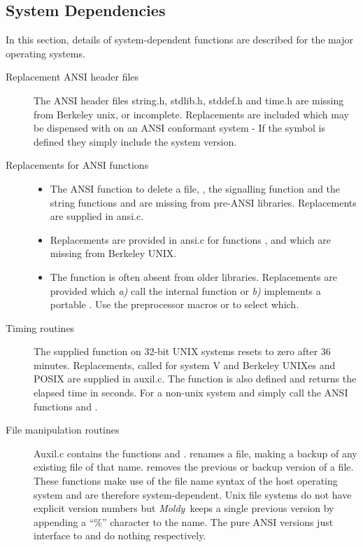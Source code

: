 \documentclass[a4paper,twoside]{report}
\newcommand{\Fname}[1]{{\upshape\mdseries\sffamily#1}}
\newcommand{\moldy}{\emph{Moldy}}
\begin{document}
\subsection{System Dependencies}
In this section, details of system-dependent functions are described
for the major operating systems.
  \begin{description}
\item[Replacement ANSI header files]
 \begin{sloppypar}
   The ANSI header files \Fname{string.h}, \Fname{stdlib.h},
   \Fname{stddef.h} and \Fname{time.h} are missing from Berkeley
   unix, or incomplete.  Replacements are included which may be
   dispensed with on an ANSI conformant system - If the symbol
    is defined they simply include the system
   version.
 \end{sloppypar}

\item[Replacements for ANSI functions] \hspace*{1em}
\noindent 
  \begin{itemize}
  \item The ANSI function to delete a file, , the
    signalling function  and the string functions
     and  are missing from
    pre-ANSI libraries.  Replacements are supplied in \Fname{ansi.c}.
  \item Replacements are provided in \Fname{ansi.c} for functions
    ,  and  which
    are missing from Berkeley UNIX.
  \item The function  is often absent from older
    libraries. Replacements are provided which \emph{a)} call the
    internal function  or \emph{b)} implements a
    portable .  Use the preprocessor macros
     or  to select which.
  \end{itemize}
\item[Timing routines] The supplied  function on
  32-bit UNIX systems resets to zero after 36 minutes.  Replacements,
  called  for system V and Berkeley UNIXes and
  POSIX are supplied in \Fname{auxil.c}.  The function 
  is also defined and returns the elapsed time in seconds.  For a
  non-unix system  and  simply call
  the ANSI functions  and .
\item[File manipulation routines]
 \Fname{Auxil.c} contains the functions  and
  .   renames a file, making a
  backup of any existing file of that name.  removes
  the previous or backup version of a file.  These functions make use
  of the file name syntax of the host operating system and are
  therefore system-dependent.  Unix file systems do not have explicit
  version numbers but \moldy\ keeps a single previous version by
  appending a ``\%'' character to the name.  The pure ANSI versions
  just interface to  and do nothing respectively.
\end{description}
\end{document}
